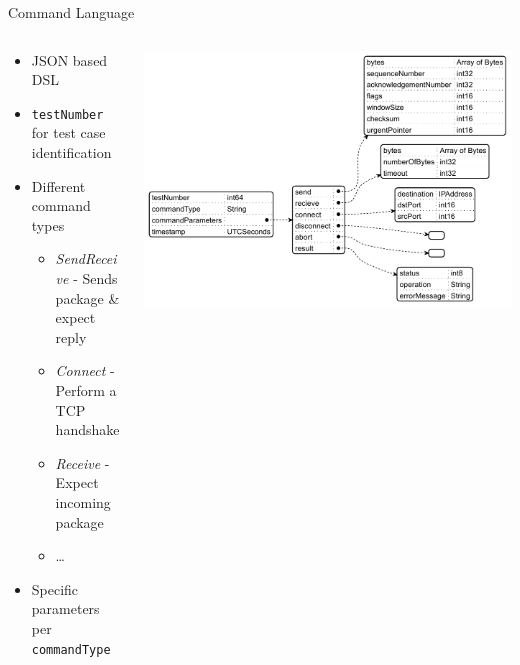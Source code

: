\documentclass[showdate=true, slidenumbers=slide]{beamerruhuisstijl169}
\begin{document}
\begin{frame}{Command Language}
    \begin{columns}[T,totalwidth=\linewidth]
        \begin{column}{0.5\textwidth}
            \begin{itemize}
                \item JSON based DSL
                \item \texttt{testNumber} for test case identification
                \item Different command types
                \begin{itemize}
                    \item \textit{SendReceive} - Sends package \& expect reply
                    \item \textit{Connect} - Perform a TCP handshake
                    \item \textit{Receive} - Expect incoming package
                    \item \dots
                \end{itemize}
                \item Specific parameters per \texttt{commandType}
            \end{itemize}
        \end{column}
        \begin{column}{0.5\textwidth}
            \includegraphics[width=\textwidth]{figures/ControlMessagesJson.pdf}
        \end{column}
    \end{columns}
\end{frame}
\end{document}
